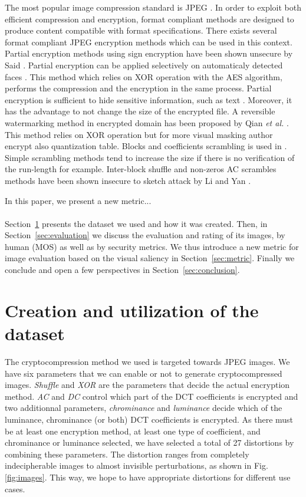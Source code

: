 \documentclass{article}
\begin{document}
The most popular image compression standard is JPEG \cite{wallace1992jpeg}. In order to exploit both efficient compression and encryption, format compliant methods are designed to produce content compatible with format specifications. There exists several format compliant JPEG encryption methods which can be used in this context. Partial encryption methods using sign encryption have been shown unsecure by Said \cite{said2005measuring}. Partial encryption can be applied selectively on automaticaly detected faces \cite{rodrigues2006selective}. This method which relies on XOR operation with the AES algorithm, performs the compression and the encryption in the same process. Partial encryption is sufficient to hide sensitive information, such as text \cite{pinto2013protection}. Moreover, it has the advantage to not change the size of the encrypted file. A reversible watermarking method in encrypted domain has been proposed by Qian \textit{et al.} \cite{qian2014reversible}. This method relies on XOR operation but for more visual masking author encrypt also quantization table. Blocks and coefficients scrambling is used in \cite{niu2008jpeg, unterweger2012length, minemura2012jpeg, ong2015beyond}. Simple scrambling methods tend to increase the size if there is no verification of the run-length for example. Inter-block shuffle and non-zeros AC scrambles methods have been shown insecure to sketch attack by Li and Yan \cite{li2007leak}.

In this paper, we present a new metric...

\paragraph*{}
Section~\ref{sec:dataset} presents the dataset we used and how it was created. Then, in Section~\ref{sec:evaluation} we discuss the evaluation and rating of its images, by human (MOS) as well as by security metrics. We thus introduce a new metric for image evaluation based on the visual saliency in Section~\ref{sec:metric}. Finally we conclude and open a few perspectives in Section~\ref{sec:conclusion}.

\section{Creation and utilization of the dataset}
\label{sec:dataset}
The cryptocompression method we used is targeted towards JPEG images. We have six parameters that we can enable or not to generate cryptocompressed images. \textit{Shuffle} and \textit{XOR} are the parameters that decide the actual encryption method. \textit{AC} and \textit{DC} control which part of the DCT coefficients is encrypted and two additionnal parameters, \textit{chrominance} and \textit{luminance} decide which of the luminance, chrominance (or both) DCT coefficients is encrypted. As there must be at least one encryption method, at least one type of coefficient, and chrominance or luminance selected, we have selected a total of 27 distortions by combining these parameters. The distortion ranges from completely indecipherable images to almost invisible perturbations, as shown in Fig. \ref{fig:images}. This way, we hope to have appropriate distortions for different use cases.
\end{document}
